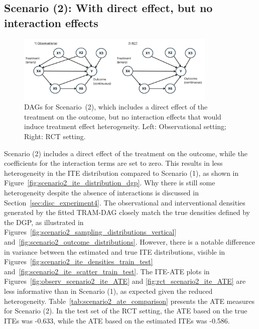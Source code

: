\clearpage


\subsection{Scenario (2): With direct effect, but no interaction effects}

\begin{figure}[H]
\centering
\includegraphics[width=0.85\textwidth]{img/exp4_dag_2.png}
\caption{DAGs for Scenario~(2), which includes a direct effect of the treatment on the outcome, but no interaction effects that would induce treatment effect heterogeneity. Left: Observational setting; Right: RCT setting.}
\label{fig:ite_dag_observational_2}
\end{figure}

Scenario (2) includes a direct effect of the treatment on the outcome, while the coefficients for the interaction terms are set to zero. This results in less heterogeneity in the ITE distribution compared to Scenario (1), as shown in Figure~\ref{fig:scenario2_ite_distribution_dgp}. Why there is still some heterogeneity despite the absence of interactions is discussed in Section~\ref{sec:disc_experiment4}. The observational and interventional densities generated by the fitted TRAM-DAG closely match the true densities defined by the DGP, as illustrated in Figures~\ref{fig:scenario2_sampling_distributions_vertical} and~\ref{fig:scenario2_outcome_distributions}. However, there is a notable difference in variance between the estimated and true ITE distributions, visible in Figures~\ref{fig:scenario2_ite_densities_train_test} and~\ref{fig:scenario2_ite_scatter_train_test}. The ITE-ATE plots in Figures~\ref{fig:observ_scenario2_ite_ATE} and \ref{fig:rct_scenario2_ite_ATE} are less informative than in Scenario (1), as expected given the reduced heterogeneity. Table~\ref{tab:scenario2_ate_comparison} presents the ATE measures for Scenario (2). In the test set of the RCT setting, the ATE based on the true ITEs was -0.633, while the ATE based on the estimated ITEs was -0.586.


